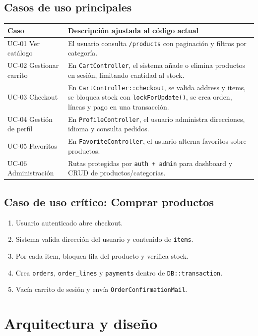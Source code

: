 \documentclass[12pt,a4paper]{report}
\begin{document}
\section{Casos de uso principales}

\begin{tabularx}{\textwidth}{@{}lX@{}}
\toprule
\textbf{Caso} & \textbf{Descripción ajustada al código actual} \\
\midrule
UC-01 Ver catálogo & El usuario consulta \texttt{/products} con paginación y filtros por categoría. \\
UC-02 Gestionar carrito & En \texttt{CartController}, el sistema añade o elimina productos en sesión, limitando cantidad al stock. \\
UC-03 Checkout & En \texttt{CartController::checkout}, se valida address y items, se bloquea stock con \texttt{lockForUpdate()}, se crea orden, líneas y pago en una transacción. \\
UC-04 Gestión de perfil & En \texttt{ProfileController}, el usuario administra direcciones, idioma y consulta pedidos. \\
UC-05 Favoritos & En \texttt{FavoriteController}, el usuario alterna favoritos sobre productos. \\
UC-06 Administración & Rutas protegidas por \texttt{auth + admin} para dashboard y CRUD de productos/categorías. \\
\bottomrule
\end{tabularx}

\section{Caso de uso crítico: Comprar productos}

\begin{enumerate}
  \item Usuario autenticado abre checkout.
  \item Sistema valida dirección del usuario y contenido de \texttt{items}.
  \item Por cada item, bloquea fila del producto y verifica stock.
  \item Crea \texttt{orders}, \texttt{order\_lines} y \texttt{payments} dentro de \texttt{DB::transaction}.
  \item Vacía carrito de sesión y envía \texttt{OrderConfirmationMail}.
\end{enumerate}

\chapter{Arquitectura y diseño}
\end{document}
